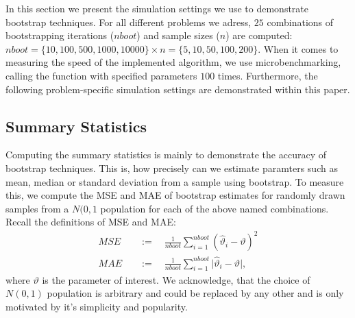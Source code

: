 In this section we present the simulation settings we use to demonstrate bootstrap techniques. For all different problems we adress, $25$ combinations of bootstrapping iterations ($nboot$) and sample sizes ($n$) are computed: $nboot = \{10, 100, 500, 1000, 10000\} \times n = \{5, 10, 50, 100, 200\}$. When it comes to measuring the speed of the implemented algorithm, we use microbenchmarking, calling the function with specified parameters $100$ times. Furthermore, the following problem-specific simulation settings are demonstrated within this paper.

\subsection{Summary Statistics}
Computing the summary statistics is mainly to demonstrate the accuracy of bootstrap techniques. This is, how precisely can we estimate paramters such as mean, median or standard deviation from a sample using bootstrap. To measure this, we compute the MSE and MAE of bootstrap estimates for randomly drawn samples from a $N(0,1$ population for each of the above named combinations. Recall the definitions of MSE and MAE:
\begin{align*}
	MSE \quad &:= \quad \frac{1}{nboot} \sum_{i=1}^{nboot} (\hat{\vartheta}_i - \vartheta)^2 \\
	MAE \quad &:= \quad \frac{1}{nboot} \sum_{i=1}^{nboot} \lvert \hat{\vartheta}_i - \vartheta \rvert,
\end{align*}
where $\vartheta$ is the parameter of interest. We acknowledge, that the choice of $N(0,1)$ population is arbitrary and could be replaced by any other and is only motivated by it's simplicity and popularity.

